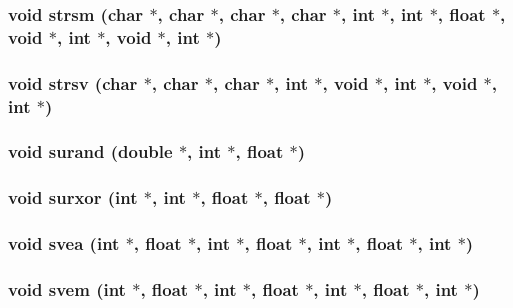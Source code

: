 \subsubsection{\setlength{\rightskip}{0pt plus 5cm}void strsm (char $\ast$, char $\ast$, char $\ast$, char $\ast$, int $\ast$, int $\ast$, float $\ast$, void $\ast$, int $\ast$, void $\ast$, int $\ast$)}\label{essl_8h_53067749332cc03a06328a1b91939f9e}


\subsubsection{\setlength{\rightskip}{0pt plus 5cm}void strsv (char $\ast$, char $\ast$, char $\ast$, int $\ast$, void $\ast$, int $\ast$, void $\ast$, int $\ast$)}\label{essl_8h_5073f65ce87719251d3e51b8ad9e4267}


\subsubsection{\setlength{\rightskip}{0pt plus 5cm}void surand (double $\ast$, int $\ast$, float $\ast$)}\label{essl_8h_3cc896e4afae07cdaacbd89ae55a2b76}


\subsubsection{\setlength{\rightskip}{0pt plus 5cm}void surxor (int $\ast$, int $\ast$, float $\ast$, float $\ast$)}\label{essl_8h_f6daaae6c351f328041878922e3c9293}


\subsubsection{\setlength{\rightskip}{0pt plus 5cm}void svea (int $\ast$, float $\ast$, int $\ast$, float $\ast$, int $\ast$, float $\ast$, int $\ast$)}\label{essl_8h_745f7001f8b8f200b306263e0cceaf79}


\subsubsection{\setlength{\rightskip}{0pt plus 5cm}void svem (int $\ast$, float $\ast$, int $\ast$, float $\ast$, int $\ast$, float $\ast$, int $\ast$)}\label{essl_8h_6fe9aa9d794a130ef6c568959296d09f}


